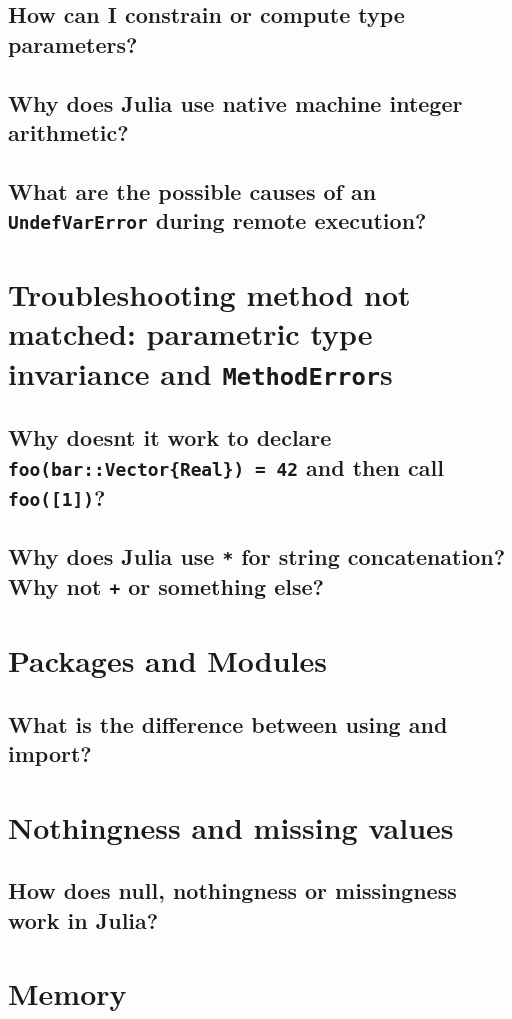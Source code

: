     \subsection{How can I constrain or compute type parameters?}
    \subsection{Why does Julia use native machine integer arithmetic?}
    \subsection{What are the possible causes of an \texttt{UndefVarError} during remote execution?}
    \section{Troubleshooting {\textquotedbl}method not matched{\textquotedbl}: parametric type invariance and \texttt{MethodError}s}
    \subsection{Why doesn{\textquotesingle}t it work to declare \texttt{foo(bar::Vector\{Real\}) = 42} and then call \texttt{foo([1])}?}
    \subsection{Why does Julia use \texttt{*} for string concatenation? Why not \texttt{+} or something else?}
    \section{Packages and Modules}
    \subsection{What is the difference between {\textquotedbl}using{\textquotedbl} and {\textquotedbl}import{\textquotedbl}?}
    \section{Nothingness and missing values}
    \subsection{How does {\textquotedbl}null{\textquotedbl}, {\textquotedbl}nothingness{\textquotedbl} or {\textquotedbl}missingness{\textquotedbl} work in Julia?}
    \section{Memory}
